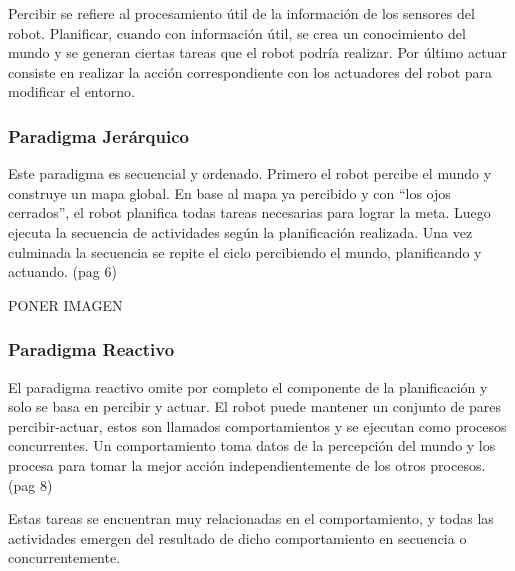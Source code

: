 Percibir se refiere al procesamiento útil de la información de los sensores del robot. Planificar, cuando con información útil, se crea un conocimiento del mundo y se generan ciertas tareas que el robot podría realizar. Por último actuar consiste en realizar la acción correspondiente con los actuadores del robot para modificar el entorno. 

\subsubsection{ Paradigma Jerárquico}

Este paradigma es secuencial y ordenado. Primero el robot percibe el mundo y construye un mapa global. En base al mapa ya percibido y con “los ojos cerrados”, el robot planifica todas tareas necesarias para lograr la meta. Luego ejecuta la secuencia de actividades según la planificación realizada. Una vez culminada la secuencia se repite el ciclo percibiendo el mundo, planificando y actuando. (pag 6)

PONER IMAGEN

\subsubsection{Paradigma Reactivo}
El paradigma reactivo omite por completo el componente de la planificación y solo se basa en percibir y actuar. El robot puede mantener un conjunto de pares percibir-actuar, estos son llamados comportamientos y se ejecutan como procesos concurrentes. Un comportamiento toma datos de la percepción del mundo y los procesa para tomar la mejor acción independientemente de los otros procesos. (pag 8)

Estas tareas se encuentran muy relacionadas en el comportamiento, y todas las actividades emergen del resultado de dicho comportamiento en secuencia o concurrentemente. 

